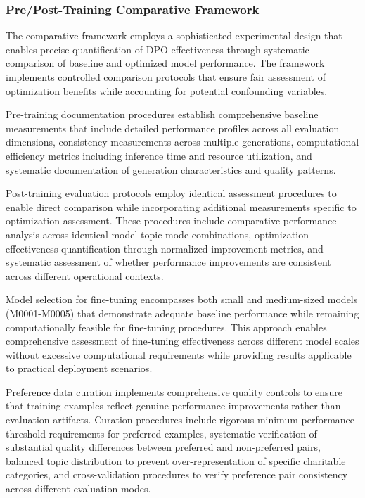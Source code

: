 \subsubsection{Pre/Post-Training Comparative Framework}

The comparative framework employs a sophisticated experimental design that enables precise quantification of DPO effectiveness through systematic comparison of baseline and optimized model performance. The framework implements controlled comparison protocols that ensure fair assessment of optimization benefits while accounting for potential confounding variables.

Pre-training documentation procedures establish comprehensive baseline measurements that include detailed performance profiles across all evaluation dimensions, consistency measurements across multiple generations, computational efficiency metrics including inference time and resource utilization, and systematic documentation of generation characteristics and quality patterns.

Post-training evaluation protocols employ identical assessment procedures to enable direct comparison while incorporating additional measurements specific to optimization assessment. These procedures include comparative performance analysis across identical model-topic-mode combinations, optimization effectiveness quantification through normalized improvement metrics, and systematic assessment of whether performance improvements are consistent across different operational contexts.

Model selection for fine-tuning encompasses both small and medium-sized models (M0001-M0005) that demonstrate adequate baseline performance while remaining computationally feasible for fine-tuning procedures. This approach enables comprehensive assessment of fine-tuning effectiveness across different model scales without excessive computational requirements while providing results applicable to practical deployment scenarios.

Preference data curation implements comprehensive quality controls to ensure that training examples reflect genuine performance improvements rather than evaluation artifacts. Curation procedures include rigorous minimum performance threshold requirements for preferred examples, systematic verification of substantial quality differences between preferred and non-preferred pairs, balanced topic distribution to prevent over-representation of specific charitable categories, and cross-validation procedures to verify preference pair consistency across different evaluation modes.

